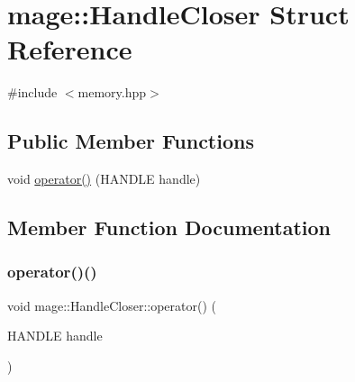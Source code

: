 \hypertarget{structmage_1_1_handle_closer}{}\section{mage\+:\+:Handle\+Closer Struct Reference}
\label{structmage_1_1_handle_closer}


{\ttfamily \#include $<$memory.\+hpp$>$}

\subsection*{Public Member Functions}
\begin{DoxyCompactItemize}
\item 
void \hyperlink{structmage_1_1_handle_closer_a088263e7c9ca4fe0ec675c45a98d6d63}{operator()} (H\+A\+N\+D\+LE handle)
\end{DoxyCompactItemize}


\subsection{Member Function Documentation}
\hypertarget{structmage_1_1_handle_closer_a088263e7c9ca4fe0ec675c45a98d6d63}{}\label{structmage_1_1_handle_closer_a088263e7c9ca4fe0ec675c45a98d6d63} 
\subsubsection{\texorpdfstring{operator()()}{operator()()}}
{\footnotesize\ttfamily void mage\+::\+Handle\+Closer\+::operator() (\begin{DoxyParamCaption}\item[{H\+A\+N\+D\+LE}]{handle }\end{DoxyParamCaption})}

